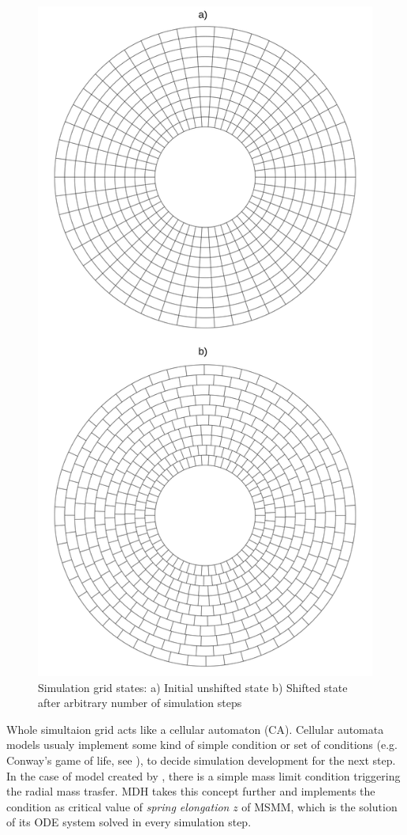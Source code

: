 \begin{figure}
\centering
\includegraphics[width=0.75\columnwidth]{img/grid_states.png}
\caption{Simulation grid states: a) Initial unshifted state b) Shifted state after arbitrary number of simulation steps}
\label{fig:grid_states}
\end{figure}

Whole simultaion grid acts like a cellular automaton (CA). Cellular automata models usualy implement some kind of simple condition or set of conditions (e.g. Conway's game of life, see \cite{gardner1970}), to decide simulation development for the next step. In the case of model created by \cite{yonehara1997}, there is a simple mass limit condition triggering the radial mass trasfer. MDH takes this concept further and implements the condition as critical value of \emph{spring elongation} $z$ of MSMM, which is the solution of its ODE system solved in every simulation step. 

